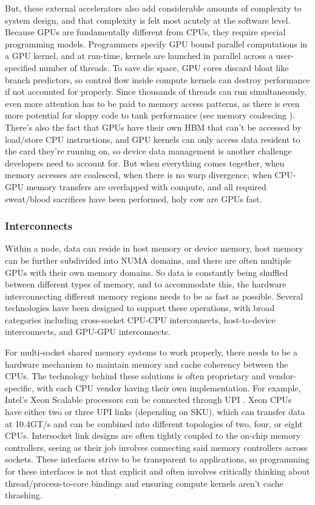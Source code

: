 But, these external accelerators also add considerable amounts of complexity to system design, and that complexity is felt most acutely at the software level.  
Because GPUs are fundamentally different from CPUs, they require special programming models.
Programmers specify GPU bound parallel computations in a GPU kernel, and at run-time, kernels are launched in parallel across a user-specified number of threads.
To save die space, GPU cores discard bloat like branch predictors, so control flow inside compute kernels can destroy performance if not accounted for properly.
Since thousands of threads can run simultaneously, even more attention has to be paid to memory access patterns, as there is even more potential  for sloppy code to tank performance (see memory coalescing \cite{CUDAMemCoalescing}).
There's also the fact that GPUs have their own HBM that can't be accessed by load/store CPU instructions, and GPU kernels can only access data resident to the card they're running on, so device data management is another challenge developers need to account for. 
But when everything comes together, when memory accesses are coalesced, when there is no warp divergence, when CPU-GPU memory transfers are overlapped with compute, and all required sweat/blood sacrifices have been performed, holy cow are GPUs fast.

\subsubsection{Interconnects}
Within a node, data can reside in host memory or device memory, host memory can be further subdivided into NUMA domains, and there are often multiple GPUs with their own memory domains.
So data is constantly being shuffled between different types of memory, and to accommodate this, the hardware interconnecting different memory regions needs to be as fast as possible.
Several technologies have been designed to support these operations, with broad categories including cross-socket CPU-CPU interconnects, host-to-device interconnects, and  GPU-GPU  interconnects.

For multi-socket shared memory systems to work properly, there needs to be a hardware mechanism to maintain memory and cache coherency between the CPUs.  
The technology behind these solutions is often proprietary and vendor-specific, with each CPU vendor having their own implementation.
For example, Intel's Xeon Scalable processors can be connected through UPI \cite{XeonTechOverview}.
Xeon CPUs have either two or three UPI links (depending on SKU), which can transfer data at 10.4GT/s and can be combined into different topologies of two, four, or eight CPUs.
Intersocket link designs are often tightly coupled to the on-chip memory controllers, seeing as their job involves connecting said memory controllers across sockets.
These interfaces strive to be transparent to applications, so programming for these interfaces is not that explicit and often involves critically thinking about thread/process-to-core bindings and ensuring compute kernels aren't cache thrashing.


